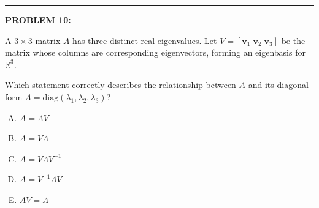 \documentclass[12pt]{amsart}
\newcommand{\divider}{
  \vspace{-1em} %
  \noindent
  \raisebox{-0.15ex}{\textbullet}%
  \hspace{0.5em}%
  \rule[0.5ex]{0.95\textwidth}{1.0pt}%
  \hspace{0.5em}%
  \raisebox{-0.15ex}{\textbullet}%
  \vspace{0em} %
}
\begin{document}


\divider
\newpage

{\bf PROBLEM 10:}

A $3 \times 3$ matrix $A$ has three distinct real eigenvalues. Let $V = [\mathbf{v}_1 \; \mathbf{v}_2 \; \mathbf{v}_3]$ be the matrix whose columns are corresponding eigenvectors, forming an eigenbasis for $\mathbb{R}^3$.

Which statement correctly describes the relationship between $A$ and its diagonal form $\Lambda = \text{diag}(\lambda_1, \lambda_2, \lambda_3)$?

\begin{enumerate}[(A)]
\item $A = \Lambda V$
\item $A = V\Lambda$
\item $A = V\Lambda V^{-1}$
\item $A = V^{-1}\Lambda V$
\item $AV = \Lambda$
\end{enumerate}
\end{document}
